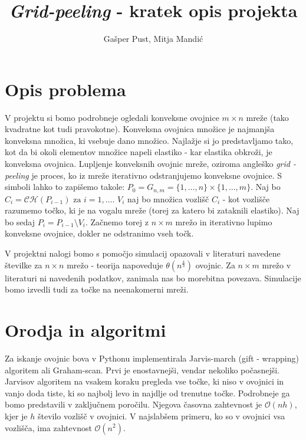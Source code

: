 \documentclass[a4paper]{article}
\title{\textit{Grid-peeling} - kratek opis projekta}
\author{Gašper Pust, Mitja Mandić}
\begin{document}
\begin{titlepage}
 \maketitle
\end{titlepage}
%

\section{Opis problema}
V projektu si bomo podrobneje ogledali konveksne ovojnice $m \times n$ mreže (tako kvadratne kot tudi pravokotne). Konveksna ovojnica množice je najmanjša konveksna množica, 
ki vsebuje dano množico.
Najlažje si jo predstavljamo tako, kot da bi okoli elementov množice napeli elastiko - kar elastika obkroži, je konveksna ovojnica. Lupljenje konveksnih ovojnic mreže,
oziroma angleško \textit{grid - peeling} je proces, ko iz mreže iterativno odstranjujemo konveksne ovojnice. S simboli lahko to zapišemo takole:
$ P_{0} = G_{n,m} = \{1,\ldots, n\} \times \{1, \ldots, m\}$. Naj bo $C_{i} = \mathcal{C}\mathcal{H}(P_{i-1}) \text{ za } i = 1, \ldots$. $V_{i}$ 
naj bo množica vozlišč $C_{i}$
- kot vozlišče razumemo točko, ki je na vogalu mreže (torej za katero bi zataknili elastiko). Naj bo sedaj $P_{i} = P_{i-1} \setminus V_{i}$. 
Začnemo torej z $n \times m$ mrežo in iterativno lupimo konveksne ovojnice, dokler ne odstranimo vseh točk.

V projektni nalogi bomo s pomočjo simulacij opazovali v literaturi navedene številke za $n \times n$ mrežo - teorija napoveduje $\theta(n ^ \frac{4}{3})$ ovojnic.
Za $n \times m$ mrežo v literaturi ni navedenih podatkov, zanimala nas bo morebitna povezava. Simulacije bomo izvedli tudi za točke na neenakomerni mreži.

\section{Orodja in algoritmi}
Za iskanje ovojnic bova v Pythonu implementirala Jarvis-march (gift - wrapping) algoritem ali Graham-scan. Prvi je enostavnejši, vendar nekoliko počasnejši.
Jarvisov algoritem na vsakem koraku pregleda vse točke, ki niso v ovojnici in vanjo doda tiste, ki so najbolj levo in najdlje od trenutne točke. Podrobneje ga
bomo predstavili v zaključnem poročilu. Njegova časovna zahtevnost je $\mathcal{O}(nh)$, kjer je $h$ število vozlišč v ovojnici. V najslabšem primeru, ko so v
ovojnici vsa vozlišča, ima zahtevnost $\mathcal{O}(n^2)$.
\end{document}
